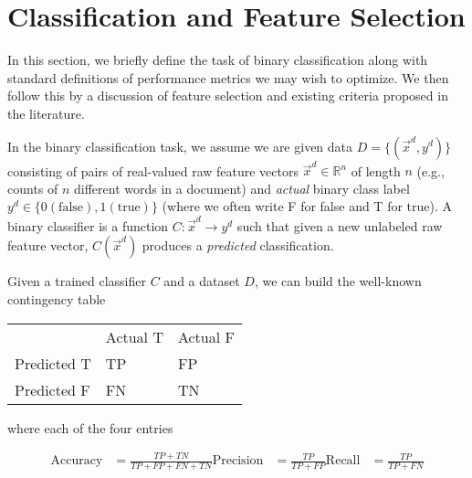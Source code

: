 \section{Classification and Feature Selection}

In this section, we briefly define the task of binary classification
along with standard definitions of performance metrics we may wish 
to optimize.  We then follow this by a discussion of feature selection and
existing criteria proposed in the literature.

In the binary classification task, we assume we are given data $D = \{
(\vec{x}^d, y^d) \}$ consisting of pairs of real-valued raw 
feature vectors $\vec{x}^d \in \mathbb{R}^n$
of length $n$ (e.g., counts of $n$ different words in a document) and
\emph{actual} binary class label $y^d \in \{ 0 (\mathrm{false}), 1 (\mathrm{true}) \}$ (where
we often write F for false and T for true).
A binary classifier is a function $C: \vec{x}^d \to y^d$ such that given
a new unlabeled raw feature vector, $C(\vec{x}^d)$ produces a \emph{predicted}
classification.

Given a trained classifier $C$ and a dataset $D$, we can build the 
well-known contingency table
\begin{center}
\begin{tabular}{l|l|l|} 
\multicolumn{1}{l}{} &  \multicolumn{1}{l}{Actual T} & \multicolumn{1}{l}{Actual F} \\ \cline{2-3}
Predicted T & TP & FP \\ \cline{2-3}
Predicted F & FN & TN \\ \cline{2-3}
\end{tabular}
\end{center}
where each of the four entries 

\begin{align*}
\textrm{Accuracy}  & = \frac{TP + TN}{TP + FP + FN + TN}
\textrm{Precision} & = \frac{TP}{TP + FP}
\textrm{Recall}    & = \frac{TP}{TP + FN}
\end{align*}
